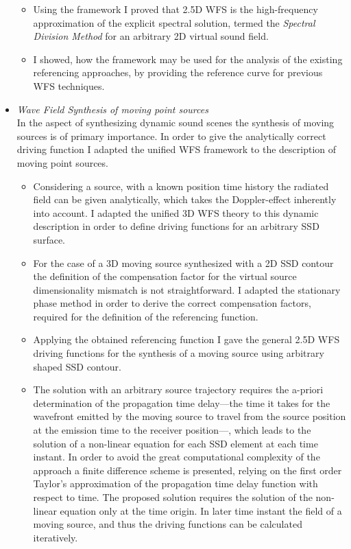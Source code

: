 \documentclass[a4paper,10pt]{article}
\begin{document}
\begin{itemize}
\begin{itemize}
\item Using the framework I proved that 2.5D WFS is the high-frequency approximation of the explicit spectral solution, termed the \emph{Spectral Division Method} for an arbitrary 2D virtual sound field.
\item I showed, how the framework may be used for the analysis of the existing referencing approaches, by providing the reference curve for previous WFS techniques.
\end{itemize}
%
\item \emph{Wave Field Synthesis of moving point sources}\\
In the aspect of synthesizing dynamic sound scenes the synthesis of moving sources is of primary importance.
In order to give the analytically correct driving function I adapted the unified WFS framework to the description of moving point sources.
\begin{itemize}
\item Considering a source, with a known position time history the radiated field can be given analytically, which takes the Doppler-effect inherently into account.
I adapted the unified 3D WFS theory to this dynamic description in order to define driving functions for an arbitrary SSD surface.
\item For the case of a 3D moving source synthesized with a 2D SSD contour the definition of the compensation factor for the virtual source dimensionality mismatch is not straightforward.
I adapted the stationary phase method in order to derive the correct compensation factors, required for the definition of the referencing function. 
\item Applying the obtained referencing function I gave the general 2.5D WFS driving functions for the synthesis of a moving source using arbitrary shaped SSD contour.
\item The solution with an arbitrary source trajectory requires the a-priori determination of the propagation time delay---the time it takes for the wavefront emitted by the moving source to travel from the source position at the emission time to the receiver position---, which leads to the solution of a non-linear equation for each SSD element at each time instant.
In order to avoid the great computational complexity of the approach a finite difference scheme is presented, relying on the first order Taylor's approximation of the propagation time delay function with respect to time.
The proposed solution requires the solution of the non-linear equation only at the time origin.
In later time instant the field of a moving source, and thus the driving functions can be calculated iteratively.

\end{itemize}
\end{itemize}
\end{document}
